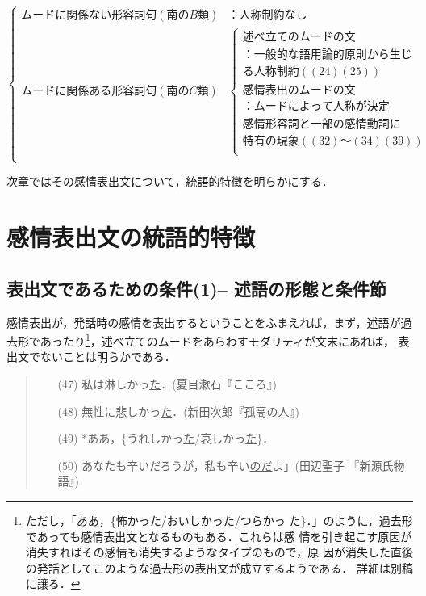 \[
\left\{ 
 \begin{array}{ll}
  ムードに関係ない形容詞句(南のB類) & ：人称制約なし \\
  ムードに関係ある形容詞句(南のC類) & 
   \left\{ 
    \begin{array}{l}
     述べ立てのムードの文\\
     　：一般的な語用論的原則から生じ\\
     　　る人称制約((24)(25))\\
     感情表出のムードの文\\
     　：ムードによって人称が決定\\
     　　感情形容詞と一部の感情動詞に\\
     　　特有の現象((32)〜(34)(39))\\
    \end{array}
\right.
\\
 \end{array}
\right.
\]
\vspace{0.3cm}

次章ではその感情表出文について，統語的特徴を明らかにする．


\section{感情表出文の統語的特徴}
\subsection{表出文であるための条件(1)-- 述語の形態と条件節}

感情表出が，発話時の感情を表出するということをふまえれば，まず，述語が過
去形であったり\footnote{ただし，「ああ，\{怖かった/おいしかった/つらかっ
た\}．」のように，過去形であっても感情表出文となるものもある．これらは感
情を引き起こす原因が消失すればその感情も消失するようなタイプのもので，原
因が消失した直後の発話としてこのような過去形の表出文が成立するようである．
詳細は別稿に譲る．}，述べ立てのムードをあらわすモダリティが文末にあれば，
表出文でないことは明らかである．

\begin{quote}
\begin{itemize}
 \item[(47)] 私は淋しかっ\underline{た}．(夏目漱石『こころ』)
 \item[(48)] 無性に悲しかっ\underline{た}．(新田次郎『孤高の人』)
 \item[(49)] *ああ，\{うれしかっ\underline{た}/哀しかっ\underline{た}\}．
 \item[(50)] あなたも辛いだろうが，私も辛い\underline{のだ}よ」(田辺聖子
	     『新源氏物語』)
\end{itemize}
\end{quote}
\vspace{0.3cm}

